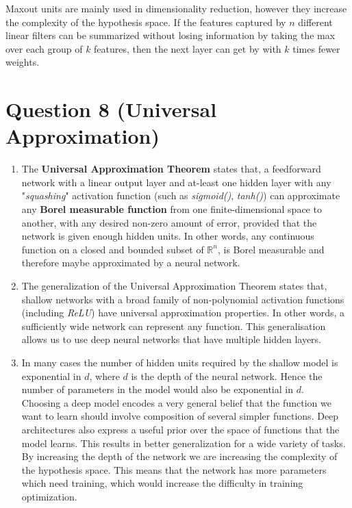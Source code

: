\documentclass[fleqn]{article}
\begin{document}
\begin{enumerate}[a)]
    Maxout units are mainly used in dimensionality reduction, however they increase the complexity of the 
    hypothesis space. If the features captured by $n$ different linear filters can be summarized without losing 
    information by taking the max over each group of $k$ features, then the next layer can get by with $k$ times 
    fewer weights.
    
\end{enumerate}
\section*{Question 8 (Universal Approximation)}

\begin{enumerate}
    \item 
    The \textbf{Universal Approximation Theorem} states that, a feedforward network with a linear output layer and at-least one hidden layer with any "\textit{squashing}" activation function (such as \textit{sigmoid()}, \textit{tanh()}) can approximate any \textbf{Borel measurable function} from one finite-dimensional space to another, with any desired non-zero amount of error, provided that the network is given enough hidden units. \hfill \break
    In other words, any continuous function on a closed and bounded subset of $\mathbb{R}^n$, is Borel measurable and therefore maybe approximated by a neural network.
    
    \item 
    The generalization of the Universal Approximation Theorem states that, shallow networks with a broad family of non-polynomial activation functions (including \textit{ReLU}) have universal approximation properties. In other words, a sufficiently wide network can represent any function. \hfill \break
    This generalisation allows us to use deep neural networks that have multiple hidden layers.
    
    \item
    In many cases the number of hidden units required by the shallow model is exponential in $d$, where $d$ is the depth of the neural network. Hence the number of parameters in the model would also be exponential in $d$. \hfill \break \\
    Choosing a deep model encodes a very general belief that the function we want to learn should involve composition of several simpler functions. Deep architectures also express a useful prior over the space of functions that the model learns. This results in better generalization for a wide variety of tasks.
    \hfill \break \\
    By increasing the depth of the network we are increasing the complexity of the hypothesis space. This means 
    that the network has more parameters which need training, which would increase the difficulty in training 
    optimization.
\end{enumerate}
\end{document}
